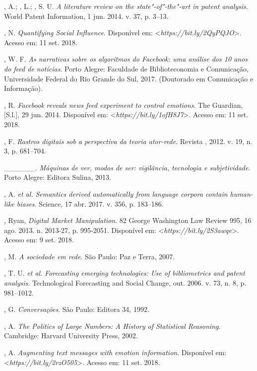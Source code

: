 \begin{Parskip}
, A.; , L.; , S. U. \emph{A literature review on the
state"-of"-the"-art in patent analysis}. World Patent Information, 1 jun.
2014. v. 37, p. 3--13.

, N. \emph{Quantifying Social Influence}. Disponível em:
\textless{}\emph{https://bit.ly/2QyPQJO}\textgreater{}. Acesso em: 11 set. 2018.

, W. F. \emph{As narrativas sobre os algoritmos do Facebook: uma
análise dos 10 anos do feed de notícias}. Porto Alegre: Faculdade de
Biblioteconomia e Comunicação, Universidade Federal do Rio Grande do
Sul, 2017. (Doutorado em Comunicação e Informação).

, R. \emph{Facebook reveals news feed experiment to control
emotions}. The Guardian, [S.l.], 29 jun. 2014. Disponível em:
\textless{}\emph{https://bit.ly/1ofH8J7}\textgreater{}. Acesso em: 11 set. 2018.

, F. \emph{Rastros digitais sob a perspectiva da teoria
ator-rede}. Revista , 2012. v. 19, n. 3, p. 681--704.

\_\_\_\_\_\_. \emph{Máquinas de ver, modos de ser: vigilância,
tecnologia e subjetividade}. Porto Alegre: Editora Sulina, 2013.

, A. \emph{et al.} \emph{Semantics derived automatically from
language corpora contain human-like biases}. Science, 17 abr. 2017. v.
356, p. 183--186.

, Ryan, \emph{Digital Market Manipulation}. 82 George Washington
Law Review 995, 16 ago. 2013. n. 2013-27, p. 995-2051. Disponível em:
\textless{}\emph{https://bit.ly/2S3awqe}\textgreater{}. Acesso em: 9 set. 2018.

, M. \emph{A sociedade em rede}. São Paulo: Paz e Terra, 2007.

, T. U. \emph{et al.} \emph{Forecasting emerging technologies: Use
of bibliometrics and patent analysis}. Technological Forecasting and
Social Change, out. 2006. v. 73, n. 8, p. 981--1012.

, G. \emph{Conversações}. São Paulo: Editora 34, 1992.

, A. \emph{The Politics of Large Numbers: A History of
Statistical Reasoning}. Cambridge: Harvard University Press, 2002.

, A. \emph{Augmenting text messages with emotion information}.
Disponível em: \textless{}\emph{https://bit.ly/2rzO505}\textgreater{}. Acesso em: 11 set. 2018.


\end{Parskip}
